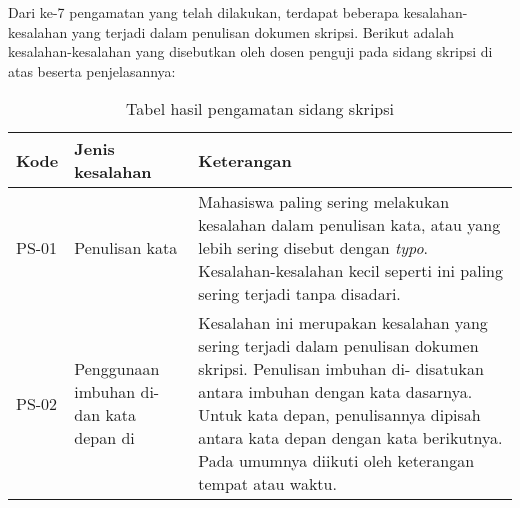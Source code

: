 Dari ke-7 pengamatan yang telah dilakukan, terdapat beberapa kesalahan-kesalahan yang terjadi dalam penulisan dokumen skripsi. Berikut adalah kesalahan-kesalahan yang disebutkan oleh dosen penguji pada sidang skripsi di atas beserta penjelasannya:


\begin{table}[H]
	\caption {Tabel hasil pengamatan sidang skripsi} \label{tab:hasil_sidang}
	\begin{center}
		\begin{tabular}{|p{1.5 cm}|>{\raggedright} p{5.5 cm}| p{7.5 cm}|}
		\hline
		Kode & Jenis kesalahan & Keterangan \\ 
		\hline
		PS-01 & Penulisan kata & Mahasiswa paling sering melakukan kesalahan dalam penulisan kata, atau yang lebih sering disebut dengan \textit{typo}. Kesalahan-kesalahan kecil seperti ini paling sering terjadi tanpa disadari. \newline \\ 
		\hline 
		PS-02 & Penggunaan imbuhan di- dan kata depan di & Kesalahan ini merupakan kesalahan yang sering terjadi dalam penulisan dokumen skripsi. Penulisan imbuhan di- disatukan antara imbuhan dengan kata dasarnya. Untuk kata depan, penulisannya dipisah antara kata depan dengan kata berikutnya. Pada umumnya diikuti oleh keterangan tempat atau waktu. \newline \\ 
		\hline 
		\end{tabular}
	\end{center}
\end{table}

